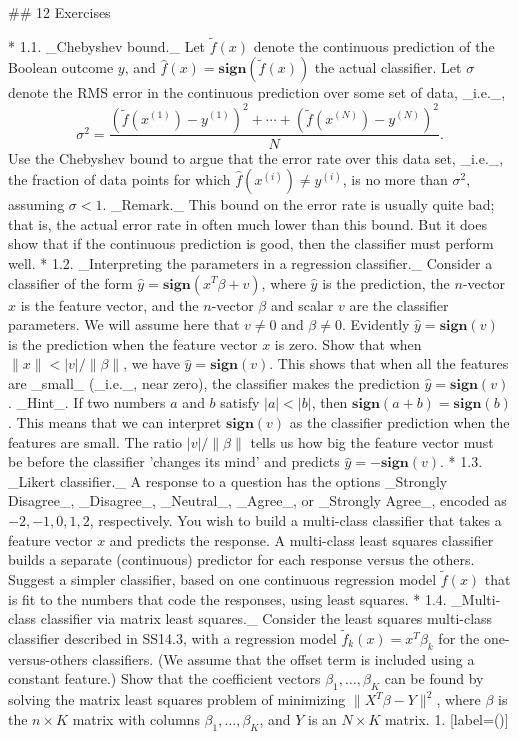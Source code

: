 

## 12 Exercises

* 1.1. _Chebyshev bound._ Let \(\tilde{f}(x)\) denote the continuous prediction of the Boolean outcome \(y\), and \(\hat{f}(x)=\mathbf{sign}(\tilde{f}(x))\) the actual classifier. Let \(\sigma\) denote the RMS error in the continuous prediction over some set of data, _i.e._, \[\sigma^{2}=\frac{(\tilde{f}(x^{(1)})-y^{(1)})^{2}+\cdots+(\tilde{f}(x^{(N)})- y^{(N)})^{2}}{N}.\] Use the Chebyshev bound to argue that the error rate over this data set, _i.e._, the fraction of data points for which \(\hat{f}(x^{(i)})\neq y^{(i)}\), is no more than \(\sigma^{2}\), assuming \(\sigma<1\). _Remark._ This bound on the error rate is usually quite bad; that is, the actual error rate in often much lower than this bound. But it does show that if the continuous prediction is good, then the classifier must perform well.
* 1.2. _Interpreting the parameters in a regression classifier._ Consider a classifier of the form \(\hat{y}=\mathbf{sign}(x^{T}\beta+v)\), where \(\hat{y}\) is the prediction, the \(n\)-vector \(x\) is the feature vector, and the \(n\)-vector \(\beta\) and scalar \(v\) are the classifier parameters. We will assume here that \(v\neq 0\) and \(\beta\neq 0\). Evidently \(\hat{y}=\mathbf{sign}(v)\) is the prediction when the feature vector \(x\) is zero. Show that when \(\|x\|<|v|/\|\beta\|\), we have \(\hat{y}=\mathbf{sign}(v)\). This shows that when all the features are _small_ (_i.e._, near zero), the classifier makes the prediction \(\hat{y}=\mathbf{sign}(v)\). _Hint_. If two numbers \(a\) and \(b\) satisfy \(|a|<|b|\), then \(\mathbf{sign}(a+b)=\mathbf{sign}(b)\). This means that we can interpret \(\mathbf{sign}(v)\) as the classifier prediction when the features are small. The ratio \(|v|/\|\beta\|\) tells us how big the feature vector must be before the classifier 'changes its mind' and predicts \(\hat{y}=-\mathbf{sign}(v)\).
* 1.3. _Likert classifier._ A response to a question has the options _Strongly Disagree_, _Disagree_, _Neutral_, _Agree_, or _Strongly Agree_, encoded as \(-2,-1,0,1,2\), respectively. You wish to build a multi-class classifier that takes a feature vector \(x\) and predicts the response. A multi-class least squares classifier builds a separate (continuous) predictor for each response versus the others. Suggest a simpler classifier, based on one continuous regression model \(\tilde{f}(x)\) that is fit to the numbers that code the responses, using least squares.
* 1.4. _Multi-class classifier via matrix least squares._ Consider the least squares multi-class classifier described in SS14.3, with a regression model \(\tilde{f}_{k}(x)=x^{T}\beta_{k}\) for the one-versus-others classifiers. (We assume that the offset term is included using a constant feature.) Show that the coefficient vectors \(\beta_{1},\ldots,\beta_{K}\) can be found by solving the matrix least squares problem of minimizing \(\|X^{T}\beta-Y\|^{2}\), where \(\beta\) is the \(n\times K\) matrix with columns \(\beta_{1},\ldots,\beta_{K}\), and \(Y\) is an \(N\times K\) matrix. 1. [label=()]
